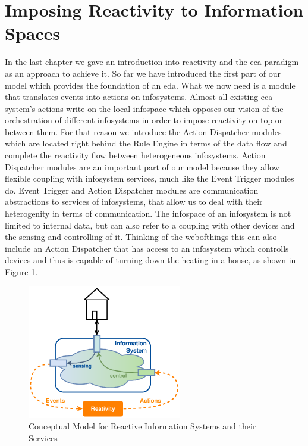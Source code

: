 \section{Imposing Reactivity to Information Spaces}
In the last chapter we gave an introduction into reactivity and the \textrm{\acrshort{eca}} paradigm as an approach to achieve it.
So far we have introduced the first part of our model which provides the foundation of an \textrm{\acrlong{eda}}.
What we now need is a module that translates events into actions on \textrm{\glspl{infosystem}}.
Almost all existing \textrm{\acrshort{eca}} system's actions write on the local \textrm{\gls{infospace}} which opposes our vision of the orchestration of different \textrm{\glspl{infosystem}} in order to impose reactivity on top or between them.
For that reason we introduce the \textrm{Action Dispatcher} modules which are located right behind the \textrm{Rule Engine} in terms of the data flow and complete the reactivity flow between heterogeneous \textrm{\glspl{infosystem}}.
\textrm{Action Dispatcher} modules are an important part of our model because they allow flexible coupling with \textrm{\gls{infosystem}} services, much like the \textrm{Event Trigger} modules do.
\textrm{Event Trigger} and \textrm{Action Dispatcher} modules are communication abstractions to services of \textrm{\glspl{infosystem}}, that allow us to deal with their heterogenity in terms of communication.
The \textrm{\gls{infospace}} of an \textrm{\gls{infosystem}} is not limited to internal data, but can also refer to a coupling with other devices and the sensing and controlling of it.
Thinking of the \textrm{\gls{webofthings}} this can also include an \textrm{Action Dispatcher} that has access to an \textrm{\gls{infosystem}} which controlls devices and thus is capable of turning down the heating in a house, as shown in Figure \ref{fig:InformationSystemWoT}.
\begin{figure}[!ht]
  \centering
  \includegraphics[width=0.6\textwidth]{figures/InformationSystemWoT}
  \caption{Conceptual Model for Reactive Information Systems and their Services}
  \label{fig:InformationSystemWoT}
\end{figure}

